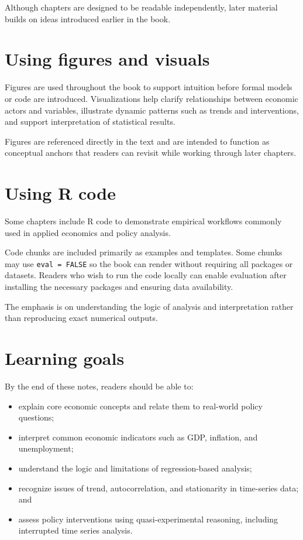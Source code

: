 \documentclass[
  11pt,
  oneside]{book}
\providecommand{\tightlist}{%
  \setlength{\itemsep}{0pt}\setlength{\parskip}{0pt}}
\begin{document}
Although chapters are designed to be readable independently, later material builds on ideas introduced earlier in the book.

\section{Using figures and visuals}\label{using-figures-and-visuals}

Figures are used throughout the book to support intuition before formal models or code are introduced. Visualizations help clarify relationships between economic actors and variables, illustrate dynamic patterns such as trends and interventions, and support interpretation of statistical results.

Figures are referenced directly in the text and are intended to function as conceptual anchors that readers can revisit while working through later chapters.

\section{Using R code}\label{using-r-code}

Some chapters include R code to demonstrate empirical workflows commonly used in applied economics and policy analysis.

Code chunks are included primarily as examples and templates. Some chunks may use \texttt{eval\ =\ FALSE} so the book can render without requiring all packages or datasets. Readers who wish to run the code locally can enable evaluation after installing the necessary packages and ensuring data availability.

The emphasis is on understanding the logic of analysis and interpretation rather than reproducing exact numerical outputs.

\section{Learning goals}\label{learning-goals}

By the end of these notes, readers should be able to:

\begin{itemize}
\tightlist
\item
  explain core economic concepts and relate them to real-world policy questions;
\item
  interpret common economic indicators such as GDP, inflation, and unemployment;
\item
  understand the logic and limitations of regression-based analysis;
\item
  recognize issues of trend, autocorrelation, and stationarity in time-series data; and
\item
  assess policy interventions using quasi-experimental reasoning, including interrupted time series analysis.
\end{itemize}
\end{document}
